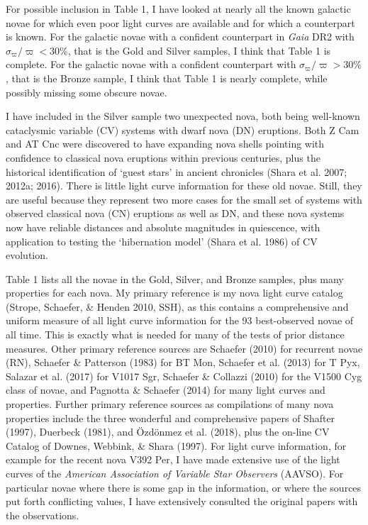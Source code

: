 \documentclass[a4paper,fleqn,usenatbib]{mnras}
\begin{document}
For possible inclusion in Table 1, I have looked at nearly all the known galactic novae for which even poor light curves are available and for which a counterpart is known.  For the galactic novae with a confident counterpart in {\it Gaia} DR2 with $\sigma_{\varpi}/\varpi<30\%$, that is the Gold and Silver samples, I think that Table 1 is complete.  For the galactic novae with a confident counterpart with $\sigma_{\varpi}/\varpi>30\%$, that is the Bronze sample, I think that Table 1 is nearly complete, while possibly missing some obscure novae.

I have included in the Silver sample two unexpected nova, both being well-known cataclysmic variable (CV) systems with dwarf nova (DN) eruptions.  Both Z Cam and AT Cnc were discovered to have expanding nova shells pointing with confidence to classical nova eruptions within previous centuries, plus the historical identification of `guest stars' in ancient chronicles (Shara et al. 2007; 2012a; 2016).  There is little light curve information for these old novae.  Still, they are useful because they represent two more cases for the small set of systems with observed classical nova (CN) eruptions as well as DN, and these nova systems now have reliable distances and absolute magnitudes in quiescence, with application to testing the `hibernation model' (Shara et al. 1986) of CV evolution.

Table 1 lists all the novae in the Gold, Silver, and Bronze samples, plus many properties for each nova.  My primary reference is my nova light curve catalog (Strope, Schaefer, \& Henden 2010, SSH), as this contains a comprehensive and uniform measure of all light curve information for the 93 best-observed novae of all time.  This is exactly what is needed for many of the tests of prior distance measures.  Other primary reference sources are Schaefer (2010) for recurrent novae (RN), Schaefer \& Patterson (1983) for BT Mon, Schaefer et al. (2013) for T Pyx, Salazar et al. (2017) for V1017 Sgr, Schaefer \& Collazzi (2010) for the V1500 Cyg class of novae, and Pagnotta \& Schaefer (2014) for many light curves and properties.  Further primary reference sources as compilations of many nova properties include the three wonderful and comprehensive papers of Shafter (1997), Duerbeck (1981), and \"{O}zd\"{o}nmez et al. (2018), plus the on-line CV Catalog of Downes, Webbink, \& Shara (1997).  For light curve information, for example for the recent nova V392 Per, I have made extensive use of the light curves of the {\it American Association of Variable Star Observers} (AAVSO).  For particular novae where there is some gap in the information, or where the sources put forth conflicting values, I have extensively consulted the original papers with the observations.
\end{document}
